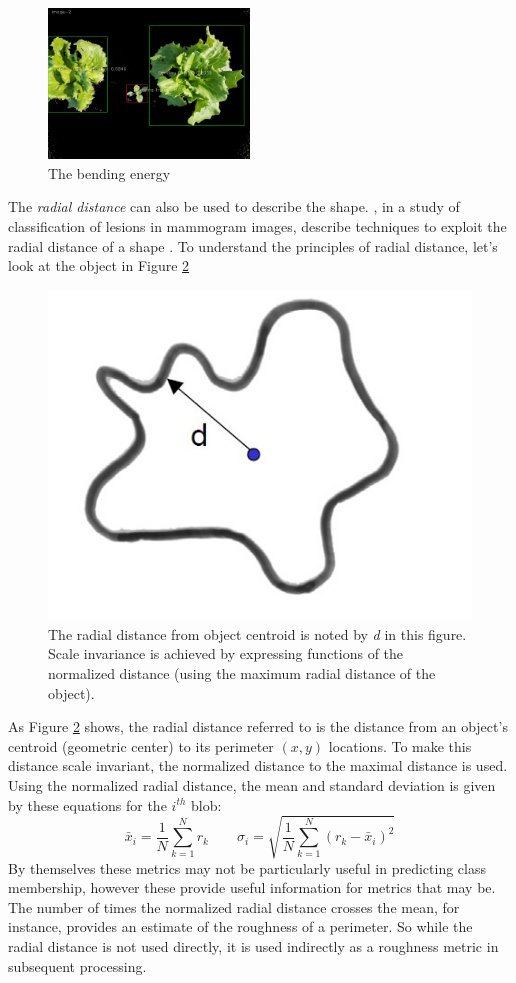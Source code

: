 \documentclass[letterpaper]{report}
\begin{document}
{%

\begin{figure}[h!]
	\centering
	\includegraphics[height=4cm]{./figures/shape-bending.jpg}
	\caption[Shape attribute: Bending Energy]{The bending energy}
	\label{fig:shape-bending}
\end{figure}

The \textit{radial distance} can also be used to describe the shape. \citeauthor{Kilday1993-aq}, in a study of classification of lesions in mammogram images, describe techniques to exploit the radial distance of a shape \parencite{Kilday1993-aq}. To understand the principles of radial distance, let’s look at the object in Figure \ref{fig:radial-distance}
\begin{figure}[H]
	\centering
	\includegraphics[width=.25\linewidth]{./figures/radial-distance.jpg}
	\caption[Radial distance from object centroid]{The radial distance from object centroid is noted by \textit{d} in this figure. Scale invariance is achieved by expressing functions of the normalized distance (using the maximum radial distance of the object).}
	\label{fig:radial-distance}	
\end{figure}
As Figure \ref{fig:radial-distance} shows, the radial distance referred to is the distance from an object's centroid (geometric center) to its perimeter $(x,y)$ locations. To make this distance scale invariant, the normalized distance to the maximal distance is used. Using the normalized radial distance, the mean and standard deviation is given by these equations for the $i^{th}$ blob:
\begin{equation}%
\bar{x}_i = \frac{1}{N}\sum_{k=1}^{N}r_k \qquad
\sigma_i = \sqrt{\frac{1}{N}\sum_{k=1}^{N}({r_k} - \bar{x}_i)^2}
\end{equation}
By themselves these metrics may not be particularly useful in predicting class membership, however these provide useful information for metrics that may be. The number of times the normalized radial distance crosses the mean, for instance, provides an estimate of the roughness of a perimeter. So while the radial distance is not used directly, it is used indirectly as a roughness metric in subsequent processing.


}
\end{document}
